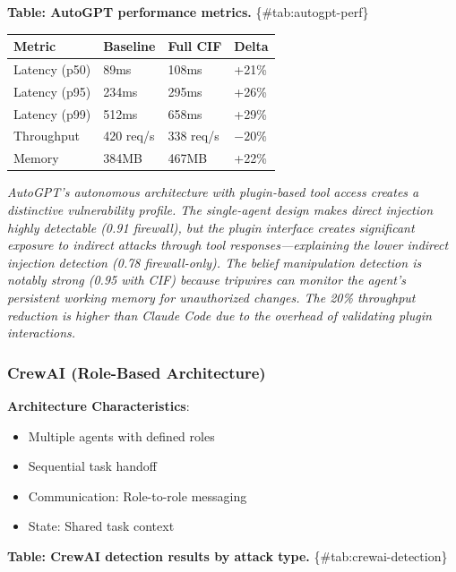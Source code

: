 \documentclass[
]{article}
\newcounter{none} %
\begin{document}
\textbf{Table: AutoGPT performance metrics.} \{\#tab:autogpt-perf\}

{\def\LTcaptype{none} %
\begin{longtable}[]{@{}llll@{}}
\toprule\noalign{}
Metric & Baseline & Full CIF & Delta \\
\midrule\noalign{}
\endhead
\bottomrule\noalign{}
\endlastfoot
Latency (p50) & 89ms & 108ms & +21\% \\
Latency (p95) & 234ms & 295ms & +26\% \\
Latency (p99) & 512ms & 658ms & +29\% \\
Throughput & 420 req/s & 338 req/s & \(-20\%\) \\
Memory & 384MB & 467MB & +22\% \\
\end{longtable}
}

\emph{AutoGPT's autonomous architecture with plugin-based tool access
creates a distinctive vulnerability profile. The single-agent design
makes direct injection highly detectable (0.91 firewall), but the plugin
interface creates significant exposure to indirect attacks through tool
responses---explaining the lower indirect injection detection (0.78
firewall-only). The belief manipulation detection is notably strong
(0.95 with CIF) because tripwires can monitor the agent's persistent
working memory for unauthorized changes. The 20\% throughput reduction
is higher than Claude Code due to the overhead of validating plugin
interactions.}

\subsubsection{CrewAI (Role-Based Architecture)}\label{sec:crewai}

\textbf{Architecture Characteristics}:

\begin{itemize}
\item Multiple agents with defined roles
\item Sequential task handoff
\item Communication: Role-to-role messaging
\item State: Shared task context
\end{itemize}

\textbf{Table: CrewAI detection results by attack type.}
\{\#tab:crewai-detection\}
\end{document}
